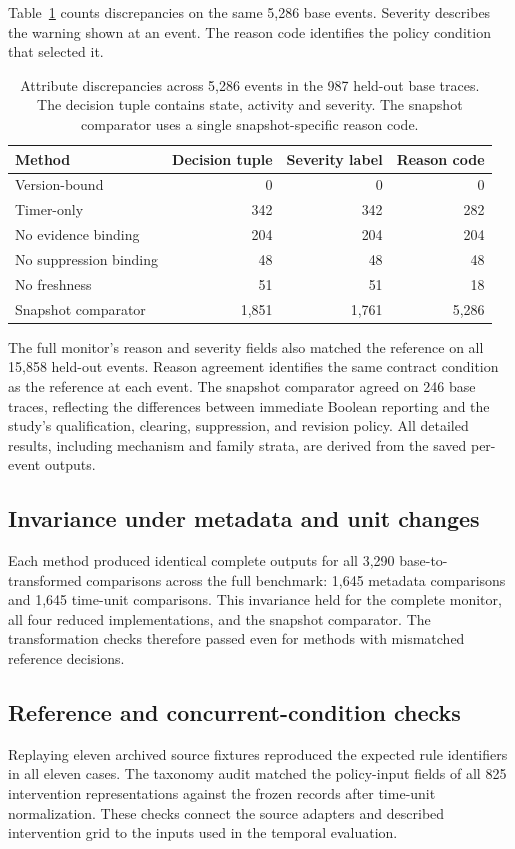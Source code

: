 \documentclass[preprint,11pt]{elsarticle}
\begin{document}
Table~\ref{tab:attributes} counts discrepancies on the same 5,286 base events. Severity describes the warning shown at an event. The reason code identifies the policy condition that selected it.
\begin{table}[H]
\centering\small
\caption{Attribute discrepancies across 5,286 events in the 987 held-out base traces. The decision tuple contains state, activity and severity. The snapshot comparator uses a single snapshot-specific reason code.}\label{tab:attributes}
\begin{tabular}{@{}lrrr@{}}\toprule
Method & Decision tuple & Severity label & Reason code\\\midrule
Version-bound & 0 & 0 & 0\\
Timer-only & 342 & 342 & 282\\
No evidence binding & 204 & 204 & 204\\
No suppression binding & 48 & 48 & 48\\
No freshness & 51 & 51 & 18\\
Snapshot comparator & 1,851 & 1,761 & 5,286\\
\bottomrule
\end{tabular}
\end{table}
The full monitor's reason and severity fields also matched the reference on all 15,858 held-out events. Reason agreement identifies the same contract condition as the reference at each event. The snapshot comparator agreed on 246 base traces, reflecting the differences between immediate Boolean reporting and the study's qualification, clearing, suppression, and revision policy. All detailed results, including mechanism and family strata, are derived from the saved per-event outputs.

\subsection{Invariance under metadata and unit changes}
Each method produced identical complete outputs for all 3,290 base-to-transformed comparisons across the full benchmark: 1,645 metadata comparisons and 1,645 time-unit comparisons. This invariance held for the complete monitor, all four reduced implementations, and the snapshot comparator. The transformation checks therefore passed even for methods with mismatched reference decisions.

\subsection{Reference and concurrent-condition checks}
Replaying eleven archived source fixtures reproduced the expected rule identifiers in all eleven cases. The taxonomy audit matched the policy-input fields of all 825 intervention representations against the frozen records after time-unit normalization. These checks connect the source adapters and described intervention grid to the inputs used in the temporal evaluation.
\end{document}
